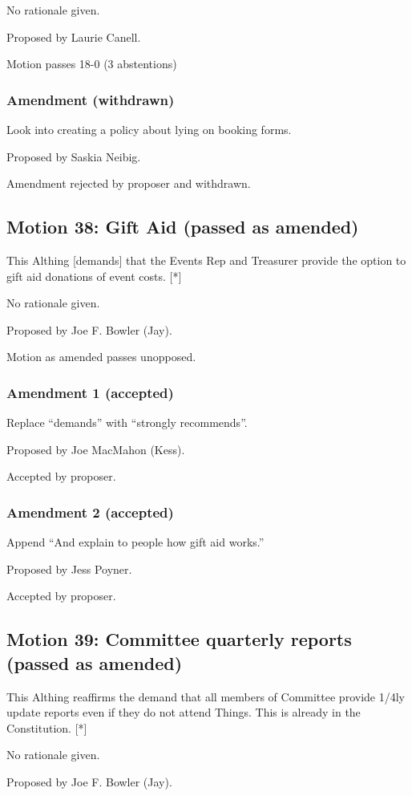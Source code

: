 \documentclass[a4paper, 12pt]{article}
\begin{document}
No rationale given.

Proposed by Laurie Canell.

Motion passes 18-0 (3 abstentions)

\subsubsection{Amendment (withdrawn)}
Look into creating a policy about lying on booking forms.

Proposed by Saskia Neibig.

Amendment rejected by proposer and withdrawn.

\subsection{Motion 38: Gift Aid (passed as amended)}
This Althing [demands] that the Events Rep and Treasurer provide the option to gift aid donations of event costs. [*]

No rationale given.

Proposed by Joe F. Bowler (Jay).

Motion as amended passes unopposed.

\subsubsection{Amendment 1 (accepted)}
Replace ``demands'' with ``strongly recommends''.

Proposed by Joe MacMahon (Kess).

Accepted by proposer.

\subsubsection{Amendment 2 (accepted)}
Append ``And explain to people how gift aid works.''

Proposed by Jess Poyner.

Accepted by proposer.

\subsection{Motion 39: Committee quarterly reports (passed as amended)}
This Althing reaffirms the demand that all members of Committee provide 1/4ly update reports even if they do not attend Things. This is already in the Constitution. [*]

No rationale given.

Proposed by Joe F. Bowler (Jay).
\end{document}
